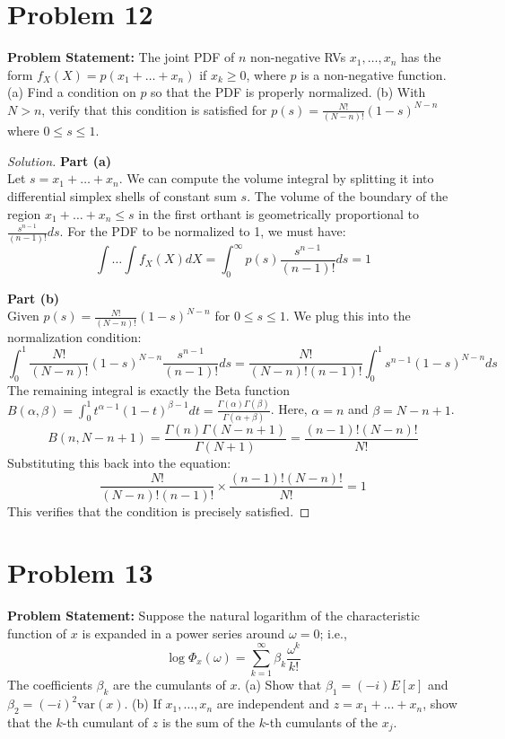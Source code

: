 \documentclass{article}
\begin{document}
\section*{Problem 12}
\textbf{Problem Statement:}
The joint PDF of $n$ non-negative RVs $x_1, \dots, x_n$ has the form $f_X(X) = p(x_1 + \dots + x_n)$ if $x_k \ge 0$, where $p$ is a non-negative function.
(a) Find a condition on $p$ so that the PDF is properly normalized.
(b) With $N > n$, verify that this condition is satisfied for $p(s) = \frac{N!}{(N-n)!}(1-s)^{N-n}$ where $0 \le s \le 1$.

\begin{proof}[Solution]
	\textbf{Part (a)}\\
	Let $s = x_1 + \dots + x_n$. We can compute the volume integral by splitting it into differential simplex shells of constant sum $s$. The volume of the boundary of the region $x_1 + \dots + x_n \le s$ in the first orthant is geometrically proportional to $\frac{s^{n-1}}{(n-1)!} ds$.
	For the PDF to be normalized to 1, we must have:
	\[
		\int \dots \int f_X(X) dX = \int_0^\infty p(s) \frac{s^{n-1}}{(n-1)!} ds = 1
	\]
	
	\textbf{Part (b)}\\
	Given $p(s) = \frac{N!}{(N-n)!}(1-s)^{N-n}$ for $0 \le s \le 1$. We plug this into the normalization condition:
	\[
		\int_0^1 \frac{N!}{(N-n)!}(1-s)^{N-n} \frac{s^{n-1}}{(n-1)!} ds = \frac{N!}{(N-n)!(n-1)!} \int_0^1 s^{n-1} (1-s)^{N-n} ds
	\]
	The remaining integral is exactly the Beta function $B(\alpha, \beta) = \int_0^1 t^{\alpha-1}(1-t)^{\beta-1} dt = \frac{\Gamma(\alpha)\Gamma(\beta)}{\Gamma(\alpha+\beta)}$. Here, $\alpha = n$ and $\beta = N - n + 1$.
	\[
		B(n, N-n+1) = \frac{\Gamma(n)\Gamma(N-n+1)}{\Gamma(N+1)} = \frac{(n-1)! (N-n)!}{N!}
	\]
	Substituting this back into the equation:
	\[
		\frac{N!}{(N-n)!(n-1)!} \times \frac{(n-1)! (N-n)!}{N!} = 1
	\]
	This verifies that the condition is precisely satisfied.
\end{proof}

\vspace{1cm}

\section*{Problem 13}
\textbf{Problem Statement:}
Suppose the natural logarithm of the characteristic function of $x$ is expanded in a power series around $\omega=0$; i.e.,
\[ \log \Phi_x(\omega) = \sum_{k=1}^{\infty} \beta_k \frac{\omega^k}{k!} \]
The coefficients $\beta_k$ are the cumulants of $x$.
(a) Show that $\beta_1 = (-i)E[x]$ and $\beta_2 = (-i)^2 \text{var}(x)$.
(b) If $x_1, \dots, x_n$ are independent and $z = x_1 + \dots + x_n$, show that the $k$-th cumulant of $z$ is the sum of the $k$-th cumulants of the $x_j$.
\end{document}
